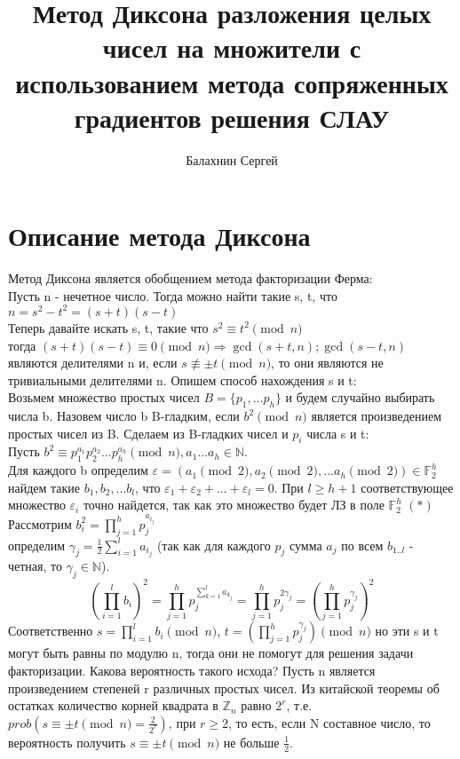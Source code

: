 \documentclass[14pt,a4paper,]{article}
\title{Метод Диксона разложения целых чисел на множители с использованием метода сопряженных градиентов решения СЛАУ }
\date{}
\author{Балахнин Сергей}
\newcommand{\N}{\mathbb{N}}   %
\newcommand{\Z}{\mathbb{Z}}   %
\newcommand{\F}{\mathbb{F}}   %
\def\EPS{\varepsilon}         %
\def\SO{\Rightarrow}          %
\begin{document}
    \maketitle
    \section{Описание метода Диксона}
    Метод Диксона является обобщением метода факторизации Ферма:\\
    Пусть n - нечетное число. Тогда можно найти такие s, t, что $n = s^2 - t^2 = (s+t)(s - t)$ \\
    Теперь давайте искать s, t, такие что $s ^ 2 \equiv t^ 2 \pmod{n}$\\
    тогда $ (s + t)(s - t) \equiv 0 \pmod{n}  \SO \gcd(s + t, n); \gcd(s - t, n)$ являются делителями n и, если $ s \not\equiv \pm t \pmod{n}$, то они являются не тривиальными делителями n.
    Опишем способ нахождения s и t:\\
    Возьмем множество простых чисел  $B = \{ p_1, ... p_h\}$ и будем случайно выбирать числа b.
    Назовем число b B-гладким, если $ b^2 \pmod n$ является произведением простых чисел из B.
    Сделаем из B-гладких чисел и $p_i$ числа s и t:\\
    Пусть $b^2 \equiv p_1^{a_1} p_2^{a_2} ... p_h^{a_h} \pmod{n}, a_1...a_h \in \N$.\\
    Для каждого b определим $\EPS = (a_1 \pmod 2, a_2 \pmod 2, ... a_h \pmod 2) \in \F_2^h$
    найдем такие $b_1, b_2, ... b_l$, что $\EPS_1 + \EPS_2 + ... +\EPS_l = 0$. При $l \geq h+1 $ соответствующее множество $\EPS_i$ точно найдется, так как это множество будет ЛЗ в поле $\F_2^h$ \hfill $(*)$\\
    Рассмотрим $b_i^2 = \prod_{j = 1}^{h} p_j^{a_{i}_{j}}$\\
    определим $\gamma_j = \frac{1}{2} \sum_{i=1}^{l} a_{i}_{j}$ (так как для каждого $p_j$ сумма $a_j$ по всем $b_{1..l}$ - четная, то $\gamma_j \in \N$).\\

    $$(\prod_{i = 1}^{l} b_i) ^ 2 =\prod_{j=1}^{h}p_j^{\sum_{k = 1}^{l} a_{k}_{j}} =  \prod_{j = 1}^{h} p_j^{2\gamma_j} = (\prod_{j = 1}^{h} p_j^{\gamma_j})^2$$
    Соответственно $s = \prod_{i = 1}^{l} b_i \pmod n $, $t = (\prod_{j = 1}^{h} p_j^{\gamma_j}) \pmod n$
    но эти s и t могут быть равны по модулю n, тогда они не помогут для решения задачи факторизации.
    Какова вероятность такого исхода? Пусть n является произведением степеней r различных простых чисел. Из китайской теоремы об остатках количество корней квадрата в $\Z_n$ равно $2^r$, т.е. $prob(s \equiv \pm t \pmod n = \frac{2}{2^r})$, при $r \geq 2$, то есть, если N составное число, то вероятность получить $s \equiv \pm t \pmod n$ не больше  $\frac{1}{2}$.
\end{document}
